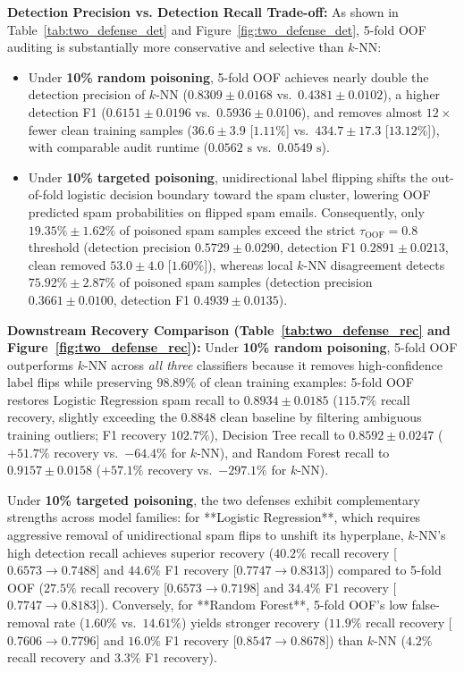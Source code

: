 \documentclass[10pt,conference]{IEEEtran}
\begin{document}
\textbf{Detection Precision vs. Detection Recall Trade-off:} As shown in Table~\ref{tab:two_defense_det} and Figure~\ref{fig:two_defense_det}, 5-fold OOF auditing is substantially more conservative and selective than $k$-NN:
\begin{itemize}
    \item Under \textbf{10\% random poisoning}, 5-fold OOF achieves nearly double the detection precision of $k$-NN ($0.8309 \pm 0.0168$ vs.\ $0.4381 \pm 0.0102$), a higher detection F1 ($0.6151 \pm 0.0196$ vs.\ $0.5936 \pm 0.0106$), and removes almost $12\times$ fewer clean training samples ($36.6 \pm 3.9$ [$1.11\%$] vs.\ $434.7 \pm 17.3$ [$13.12\%$]), with comparable audit runtime ($0.0562\text{ s}$ vs.\ $0.0549\text{ s}$).
    \item Under \textbf{10\% targeted poisoning}, unidirectional label flipping shifts the out-of-fold logistic decision boundary toward the spam cluster, lowering OOF predicted spam probabilities on flipped spam emails. Consequently, only $19.35\% \pm 1.62\%$ of poisoned spam samples exceed the strict $\tau_{\text{OOF}}=0.8$ threshold (detection precision $0.5729 \pm 0.0290$, detection F1 $0.2891 \pm 0.0213$, clean removed $53.0 \pm 4.0$ [$1.60\%$]), whereas local $k$-NN disagreement detects $75.92\% \pm 2.87\%$ of poisoned spam samples (detection precision $0.3661 \pm 0.0100$, detection F1 $0.4939 \pm 0.0135$).
\end{itemize}

\textbf{Downstream Recovery Comparison (Table~\ref{tab:two_defense_rec} and Figure~\ref{fig:two_defense_rec}):} Under \textbf{10\% random poisoning}, 5-fold OOF outperforms $k$-NN across \textit{all three} classifiers because it removes high-confidence label flips while preserving $98.89\%$ of clean training examples: 5-fold OOF restores Logistic Regression spam recall to $0.8934 \pm 0.0185$ ($115.7\%$ recall recovery, slightly exceeding the $0.8848$ clean baseline by filtering ambiguous training outliers; F1 recovery $102.7\%$), Decision Tree recall to $0.8592 \pm 0.0247$ ($+51.7\%$ recovery vs.\ $-64.4\%$ for $k$-NN), and Random Forest recall to $0.9157 \pm 0.0158$ ($+57.1\%$ recovery vs.\ $-297.1\%$ for $k$-NN).

Under \textbf{10\% targeted poisoning}, the two defenses exhibit complementary strengths across model families: for **Logistic Regression**, which requires aggressive removal of unidirectional spam flips to unshift its hyperplane, $k$-NN's high detection recall achieves superior recovery ($40.2\%$ recall recovery [$0.6573 \to 0.7488$] and $44.6\%$ F1 recovery [$0.7747 \to 0.8313$]) compared to 5-fold OOF ($27.5\%$ recall recovery [$0.6573 \to 0.7198$] and $34.4\%$ F1 recovery [$0.7747 \to 0.8183$]). Conversely, for **Random Forest**, 5-fold OOF's low false-removal rate ($1.60\%$ vs.\ $14.61\%$) yields stronger recovery ($11.9\%$ recall recovery [$0.7606 \to 0.7796$] and $16.0\%$ F1 recovery [$0.8547 \to 0.8678$]) than $k$-NN ($4.2\%$ recall recovery and $3.3\%$ F1 recovery).
\end{document}
